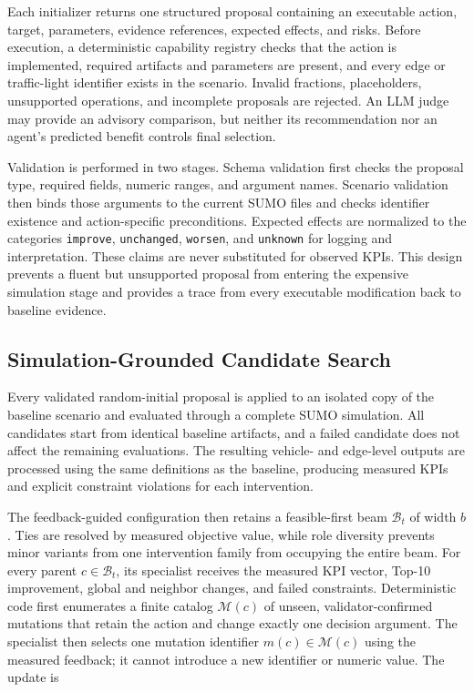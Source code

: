 Each initializer returns one structured proposal containing an executable action,
target, parameters, evidence references, expected effects, and risks.  Before
execution, a deterministic capability registry checks that the action is
implemented, required artifacts and parameters are present, and every edge or
traffic-light identifier exists in the scenario.  Invalid fractions,
placeholders, unsupported operations, and incomplete proposals are rejected.
An LLM judge may provide an advisory comparison, but neither its recommendation
nor an agent's predicted benefit controls final selection.

Validation is performed in two stages.  Schema validation first checks the
proposal type, required fields, numeric ranges, and argument names.  Scenario
validation then binds those arguments to the current SUMO files and checks
identifier existence and action-specific preconditions.  Expected effects are
normalized to the categories \texttt{improve}, \texttt{unchanged},
\texttt{worsen}, and \texttt{unknown} for logging and interpretation.  These
claims are never substituted for observed KPIs.  This design prevents a fluent
but unsupported proposal from entering the expensive simulation stage and
provides a trace from every executable modification back to baseline evidence.

\subsection{Simulation-Grounded Candidate Search}
\label{sec:candidate-search}

Every validated random-initial proposal is applied to an isolated copy of the
baseline scenario and evaluated through a complete SUMO simulation.  All
candidates start from identical baseline artifacts, and a failed candidate does
not affect the remaining evaluations.  The resulting vehicle- and edge-level
outputs are processed using the same definitions as the baseline, producing
measured KPIs and explicit constraint violations for each intervention.

The feedback-guided configuration then retains a feasible-first beam
$\mathcal{B}_{t}$ of width $b$.  Ties are resolved by measured objective value,
while role diversity prevents minor variants from one intervention family from
occupying the entire beam.  For every parent $c\in\mathcal{B}_{t}$, its
specialist receives the measured KPI vector, Top-10 improvement, global and
neighbor changes, and failed constraints.  Deterministic code first enumerates
a finite catalog $\mathcal{M}(c)$ of unseen, validator-confirmed mutations that
retain the action and change exactly one decision argument.  The specialist
then selects one mutation identifier $m(c)\in\mathcal{M}(c)$ using the measured
feedback; it cannot introduce a new identifier or numeric value.  The update is

